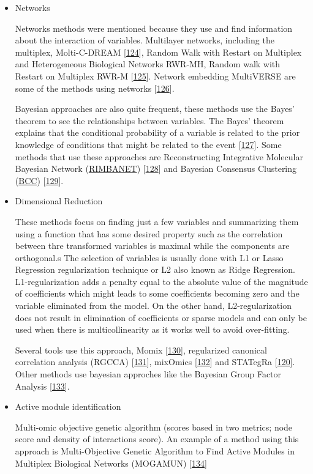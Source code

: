 \documentclass[
  12pt,
  a4paper,
  twoside,
  openright]{book}
\begin{document}
\begin{itemize}
\item
  Networks

  Networks methods were mentioned because they use and find information about the interaction of variables.
  Multilayer networks, including the multiplex, Molti-C-DREAM {[}\protect\hyperlink{ref-didier2018}{124}{]}, Random Walk with Restart on Multiplex and Heterogeneous Biological Networks RWR-MH, Random walk with Restart on Multiplex RWR-M {[}\protect\hyperlink{ref-valdeolivas2019}{125}{]}.
  Network embedding MultiVERSE are some of the methods using networks {[}\protect\hyperlink{ref-pio-lopez2021}{126}{]}.

  Bayesian approaches are also quite frequent, these methods use the Bayes' theorem to see the relationships between variables.
  The Bayes' theorem explains that the conditional probability of a variable is related to the prior knowledge of conditions that might be related to the event {[}\protect\hyperlink{ref-bayes1763}{127}{]}.
  Some methods that use these approaches are Reconstructing Integrative Molecular Bayesian Network (\href{https://labs.icahn.mssm.edu/zhulab/?s=rimbanet}{RIMBANET}) {[}\protect\hyperlink{ref-zhu2012}{128}{]} and Bayesian Consensus Clustering (\href{https://github.com/ttriche/bayesCC}{BCC}) {[}\protect\hyperlink{ref-lock2013}{129}{]}.
\item
  Dimensional Reduction

  These methods focus on finding just a few variables and summarizing them using a function that has some desired property such as the correlation between thre transformed variables is maximal while the components are orthogonal.s The selection of variables is usually done with L1 or Lasso Regression regularization technique or L2 also known as Ridge Regression.
  L1-regularization adds a penalty equal to the absolute value of the magnitude of coefficients which might leads to some coefficients becoming zero and the variable eliminated from the model.
  On the other hand, L2-regularization does not result in elimination of coefficients or sparse models and can only be used when there is multicollinearity as it works well to avoid over-fitting.

  Several tools use this approach, Momix {[}\protect\hyperlink{ref-cantini2021}{130}{]}, regularized canonical correlation analysis (RGCCA) {[}\protect\hyperlink{ref-tenenhaus2017}{131}{]}, mixOmics {[}\protect\hyperlink{ref-rohart2017}{132}{]} and STATegRa {[}\protect\hyperlink{ref-gomez-cabrero2019}{120}{]}.
  Other methods use bayesian approches like the Bayesian Group Factor Analysis {[}\protect\hyperlink{ref-virtanen2012}{133}{]}.
\item
  Active module identification

  Multi-omic objective genetic algorithm (scores based in two metrics; node score and density of interactions score).
  An example of a method using this approach is Multi-Objective Genetic Algorithm to Find Active Modules in Multiplex Biological Networks (MOGAMUN) {[}\protect\hyperlink{ref-novoa-del-toro2020}{134}{]}
\end{itemize}
\end{document}
